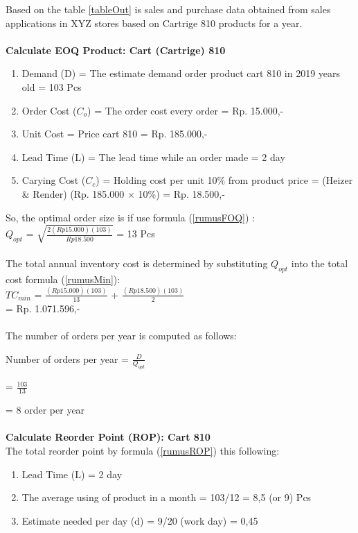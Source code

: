 \documentclass[12pt,a4paper,final]{iopart}
\begin{document}
Based on the table \ref{tableOut} is sales and purchase data obtained from sales applications in XYZ stores based on Cartrige 810 products for a year.\\ \\
\textbf{Calculate EOQ Product: Cart (Cartrige) 810}
\begin{enumerate}[label=(\alph*)]
	\item Demand (D) = The estimate demand order product cart 810 in 2019 years old = 103 Pcs
	\item Order Cost ($C_o$) = The order cost every order = Rp. 15.000,-
	\item Unit Cost = Price cart 810 = Rp. 185.000,-
	\item Lead Time (L) = The lead time while an order made = 2 day
	\item Carying Cost ($C_c$) = Holding cost per unit 10\% from product price = (Heizer \& Render) (Rp. 185.000 $\times$ 10\%) = Rp. 18.500,-
\end{enumerate}
So, the optimal order size is if use formula (\ref{rumusFOQ}) :\\

$Q_{opt}$ = $\sqrt{\frac{2(Rp15.000)(103)}{Rp18.500}}$ = 13 Pcs\\ \\
The total annual inventory cost is determined by substituting $Q_{opt}$ into the total cost formula (\ref{rumusMin}):\\

$TC_{min}$ = $\frac{(Rp15.000)(103)}{13}$ + $\frac{(Rp18.500)(103)}{2}$\\

= Rp. 1.071.596,-\\ \\
The number of orders per year is computed as follows:

Number of orders per year = $\frac{D}{Q_{opt}}$

= $\frac{103}{13}$

= 8 order per year\\ \\
\textbf{Calculate Reorder Point (ROP): Cart 810}\\
The total reorder point by formula (\ref{rumusROP}) this following:
\begin{enumerate}[label=(\alph*)]
	\item Lead Time (L) = 2 day 
	\item The average using of product in a month = 103/12 = 8,5 (or 9) Pcs
	\item Estimate needed per day (d) = 9/20 (work day) = 0,45
\end{enumerate}
\end{document}
